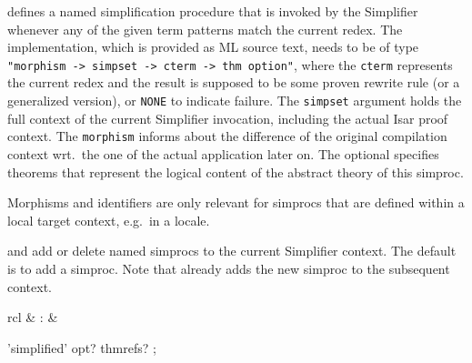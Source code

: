 \begin{isabellebody}
\begin{isamarkuptext}
\begin{descr}
  \item [\hyperlink{command.simproc_setup}{\mbox{\isa{\isacommand{simproc{\isacharunderscore}setup}}}}] defines a named simplification
  procedure that is invoked by the Simplifier whenever any of the
  given term patterns match the current redex.  The implementation,
  which is provided as ML source text, needs to be of type \verb|"morphism -> simpset -> cterm -> thm option"|, where the \verb|cterm| represents the current redex  and the result is
  supposed to be some proven rewrite rule  (or a
  generalized version), or \verb|NONE| to indicate failure.  The
  \verb|simpset| argument holds the full context of the current
  Simplifier invocation, including the actual Isar proof context.  The
  \verb|morphism| informs about the difference of the original
  compilation context wrt.\ the one of the actual application later
  on.  The optional \hyperlink{keyword.identifier}{\mbox{}} specifies theorems that
  represent the logical content of the abstract theory of this
  simproc.

  Morphisms and identifiers are only relevant for simprocs that are
  defined within a local target context, e.g.\ in a locale.

  \item [\isa{{\isachardoublequote}simproc\ add{\isacharcolon}\ name{\isachardoublequote}} and \isa{{\isachardoublequote}simproc\ del{\isacharcolon}\ name{\isachardoublequote}}]
  add or delete named simprocs to the current Simplifier context.  The
  default is to add a simproc.  Note that \hyperlink{command.simproc_setup}{\mbox{}}
  already adds the new simproc to the subsequent context.

  \end{descr}%
\end{isamarkuptext}%
\isamarkuptrue%
%
\isamarkuptrue%
%
\begin{isamarkuptext}%
\begin{matharray}{rcl}
    \hypertarget{attribute.simplified}{\hyperlink{attribute.simplified}{\mbox{}}} & : & \isaratt \\
  \end{matharray}

  \begin{rail}
    'simplified' opt? thmrefs?
    ;


\end{rail}
\end{isamarkuptext}
\end{isabellebody}
